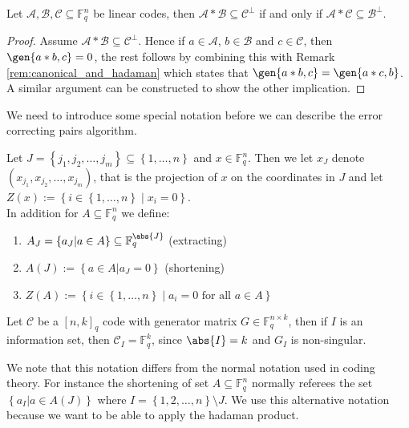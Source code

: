 \begin{lemma}\label{lem:hadaman_and_dual}
  Let $\mathcal{A}, \mathcal{B}, \mathcal{C} \subseteq \mathbb{F}_q^n$ be linear codes, then $\mathcal{A} * \mathcal{B} \subseteq \mathcal{C}^{\perp}$ if and only if $\mathcal{A} * \mathcal{C} \subseteq \mathcal{B}^{\perp}$.
\end{lemma}
\begin{proof}
  Assume $\mathcal{A} * \mathcal{B} \subseteq \mathcal{C}^{\perp}$. Hence if $a \in \mathcal{A}$, $b \in \mathcal{B}$ and $c \in \mathcal{C}$, then $\gen{a * b, c} = 0$, the rest follows by combining this with Remark \ref{rem:canonical_and_hadaman} which states that $\gen{a * b , c} = \gen{a * c, b}$. A similar argument can be constructed to show the other implication.
\end{proof}
We need to introduce some special notation before we can describe the error correcting pairs algorithm.
\begin{definition}
  Let $J = \left\{j_1, j_2, \ldots, j_{m}\right\} \subseteq \left\{1, \ldots, n\right\}$ and $x \in \mathbb{F}_q^n$. Then we let $x_J$ denote $(x_{j_1}, x_{j_2}, \ldots, x_{j_{m}})$, that is the projection of $x$ on the coordinates in $J$ and let $Z(x) := \left\{i \in \left\{1, \ldots, n\right\} \middle| x_i = 0\right\}$. \\
  In addition for $A \subseteq \mathbb{F}_q^n$ we define:
  \begin{enumerate}
    \item $A_J = \left\{a_J | a \in A\right\} \subseteq \mathbb{F}_q^{\abs{J}}$ (extracting)
    \item $A(J) := \left\{a \in A | a_J = 0\right\}$ (shortening)
    \item $Z(A) := \left\{i \in \left\{1, \ldots, n\right\} \middle| a_i = 0 \text{ for all } a \in A\right\}$
  \end{enumerate}
\end{definition}
\begin{remark}
  Let $\mathcal{C}$ be a $[n, k]_q$ code with generator matrix $G \in \mathbb{F}_q^{n \times k}$, then if $I$ is an information set, then $\mathcal{C}_I = \mathbb{F}_q^{k}$, since $\abs{I} = k$ and $G_I$ is non-singular.
\end{remark}
We note that this notation differs from the normal notation used in coding theory. For instance the shortening of set $A \subseteq \mathbb{F}_q^{n}$ normally referees the set $\left\{a_{I} | a  \in A(J)\right\}$ where $I = \left\{1, 2, \ldots, n\right\} \setminus J$. We use this alternative notation because we want to be able to apply the hadaman product.
